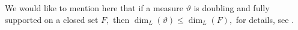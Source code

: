 \documentclass{amsproc}
\newtheorem{theorem}{Theorem}[section]
\theoremstyle{definition}
\newtheorem{definition}[theorem]{Definition}
\newtheorem{example}[theorem]{Example}
\theoremstyle{remark}
\numberwithin{equation}{section}
\begin{document}
We would like to mention here that if a measure $\vartheta$ is doubling and fully supported on a closed set $F,$ then $\dim_L(\vartheta)\le \dim_L(F),$
for details, see \cite[Lemma 4.1.2]{Fraser}.
\end{document}
